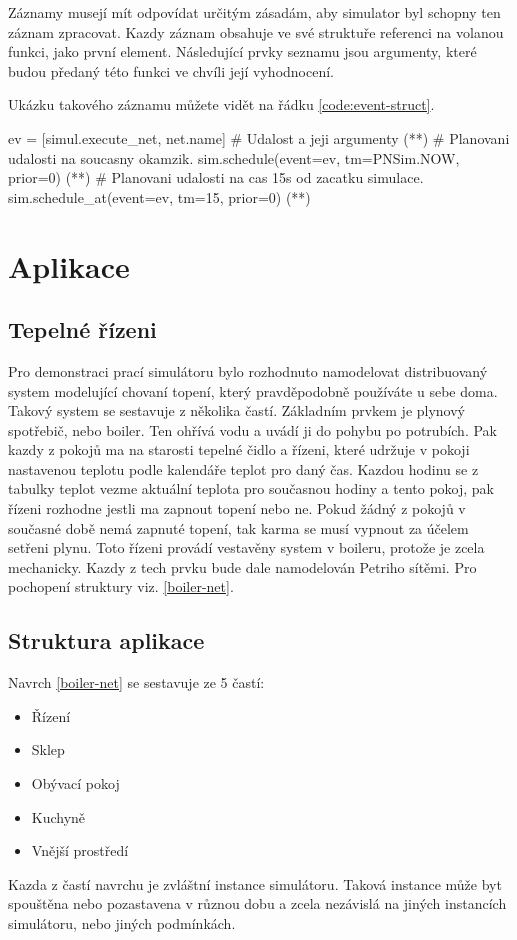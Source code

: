 Záznamy musejí mít odpovídat určitým zásadám, aby simulator byl schopny ten záznam zpracovat. Kazdy záznam obsahuje ve své struktuře referenci na volanou funkci, jako první element. Následující prvky seznamu jsou argumenty, které budou předaný této funkci ve chvíli její vyhodnocení.

Ukázku takového záznamu můžete vidět na řádku \ref{code:event-struct}.

\begin{python}
  ev = [simul.execute_net, net.name] # Udalost a jeji argumenty (*\label{code:event-struct}*)
  # Planovani udalosti na soucasny okamzik.
  sim.schedule(event=ev, tm=PNSim.NOW, prior=0) (*\label{code:schedule}*)
  # Planovani udalosti na cas 15s od zacatku simulace.
  sim.schedule_at(event=ev, tm=15, prior=0) (*\label{code:schedule-at}*)
\end{python}


\chapter{Aplikace}

\section{Tepelné řízeni}
\label{sec:tepelne-rizeni}
Pro demonstraci prací simulátoru bylo rozhodnuto namodelovat distribuovaný system modelující chovaní topení, který pravděpodobně používáte u sebe doma. Takový system se sestavuje z několika častí. Základním prvkem je plynový spotřebič, nebo boiler. Ten ohřívá vodu a uvádí ji do pohybu po potrubích. Pak kazdy z pokojů ma na starosti tepelné čidlo a řízeni, které udržuje v pokoji nastavenou teplotu podle kalendáře teplot pro daný čas. Kazdou hodinu se z tabulky teplot vezme aktuální teplota pro současnou hodiny a tento pokoj, pak řízeni rozhodne jestli ma zapnout topení nebo ne. Pokud žádný z pokojů v současné době nemá zapnuté topení, tak karma se musí vypnout za účelem setřeni plynu. Toto řízeni provádí vestavěny system v boileru, protože je zcela mechanicky. Kazdy z tech prvku bude dale namodelován Petriho sítěmi. Pro pochopení struktury viz. \ref{boiler-net}.

\section{Struktura aplikace}

Navrch \ref{boiler-net} se sestavuje ze 5 častí:
\begin{itemize}
  \item Řízení
  \item Sklep
  \item Obývací pokoj
  \item Kuchyně
  \item Vnější prostředí
\end{itemize}
Kazda z častí navrchu je zvláštní instance simulátoru. Taková instance může byt spouštěna nebo pozastavena v různou dobu a zcela nezávislá na jiných instancích simulátoru, nebo jiných podmínkách.

